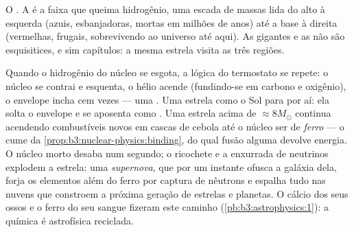 \begin{omfigure}

{\small O . A  é a
faixa que queima hidrogênio, uma escada de massas lida do alto à
esquerda (azuis, esbanjadoras, mortas em milhões de anos) até a base à
direita (vermelhas, frugais, sobrevivendo ao universo até aqui). As
gigantes e as  não são esquisitices, e sim capítulos: a
mesma estrela visita as três regiões.}
\end{omfigure}

\begin{remark}\label{rem:b3:astrophysics:evolution}
Quando o hidrogênio do núcleo se esgota, a lógica do termostato se
repete: o núcleo se contrai e esquenta, o hélio acende (fundindo-se em
carbono e oxigênio), o envelope incha cem vezes --- uma .
Uma estrela como o Sol para por aí: ela solta o envelope e se aposenta
como . Uma estrela acima de $\approx8M_\odot$ continua acendendo
combustíveis novos em cascas de cebola até o núcleo ser de \emph{ferro} ---
o cume da \cref{prop:b3:nuclear-physics:binding}, do qual fusão alguma
devolve energia. O núcleo morto desaba num segundo; o
ricochete e a enxurrada de neutrinos explodem a estrela: uma
\emph{supernova}, que por um instante ofusca a galáxia dela, forja os
elementos além do ferro por captura de nêutrons e espalha tudo
nas nuvens que constroem a próxima geração de estrelas e
planetas. O cálcio dos seus ossos e o ferro do seu sangue
fizeram este caminho (\cref{pb:b3:astrophysics:1}): a química é
astrofísica reciclada.
\end{remark}

